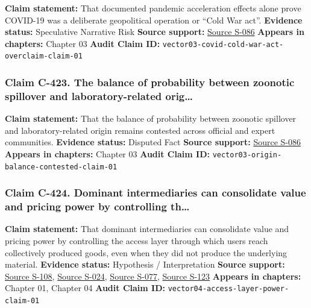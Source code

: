 \documentclass[
  american,
  11pt,
  letterpaper,
]{article}
\begin{document}
\textbf{Claim statement:} That documented pandemic acceleration effects
alone prove COVID-19 was a deliberate geopolitical operation or ``Cold
War act''. \textbf{Evidence status:} Speculative Narrative Risk
\textbf{Source support:}
\hyperref[source-s-086-report-on-potential-links-between-the-wuhan-institute-of-virology-and-the-origins-of-covid-19]{Source
S-086} \textbf{Appears in chapters:} Chapter 03 \textbf{Audit Claim ID:}
\texttt{vector03-covid-cold-war-act-overclaim-claim-01}

\subsubsection{Claim C-423. The balance of probability between zoonotic
spillover and laboratory-related
orig\ldots{}}\label{claim-c-423-the-balance-of-probability-between-zoonotic-spillover-and-laboratory-related-orig}

\textbf{Claim statement:} That the balance of probability between
zoonotic spillover and laboratory-related origin remains contested
across official and expert communities. \textbf{Evidence status:}
Disputed Fact \textbf{Source support:}
\hyperref[source-s-086-report-on-potential-links-between-the-wuhan-institute-of-virology-and-the-origins-of-covid-19]{Source
S-086} \textbf{Appears in chapters:} Chapter 03 \textbf{Audit Claim ID:}
\texttt{vector03-origin-balance-contested-claim-01}

\subsubsection{Claim C-424. Dominant intermediaries can consolidate
value and pricing power by controlling
th\ldots{}}\label{claim-c-424-dominant-intermediaries-can-consolidate-value-and-pricing-power-by-controlling-th}

\textbf{Claim statement:} That dominant intermediaries can consolidate
value and pricing power by controlling the access layer through which
users reach collectively produced goods, even when they did not produce
the underlying material. \textbf{Evidence status:} Hypothesis /
Interpretation \textbf{Source support:}
\hyperref[source-s-108-language-models-are-unsupervised-multitask-learners]{Source
S-108},
\hyperref[source-s-024-reddit-strikes-60m-deal-allowing-google-to-train-ai-models-on-its-posts-unveils-ipo-plans]{Source
S-024},
\hyperref[source-s-077-the-problem-with-annotation-human-labour-and-outsourcing-between-france-and-madagascar]{Source
S-077},
\hyperref[source-s-123-how-ai-is-ruining-your-life-to-build-an-empire]{Source
S-123} \textbf{Appears in chapters:} Chapter 01, Chapter 04
\textbf{Audit Claim ID:} \texttt{vector04-access-layer-power-claim-01}
\end{document}
